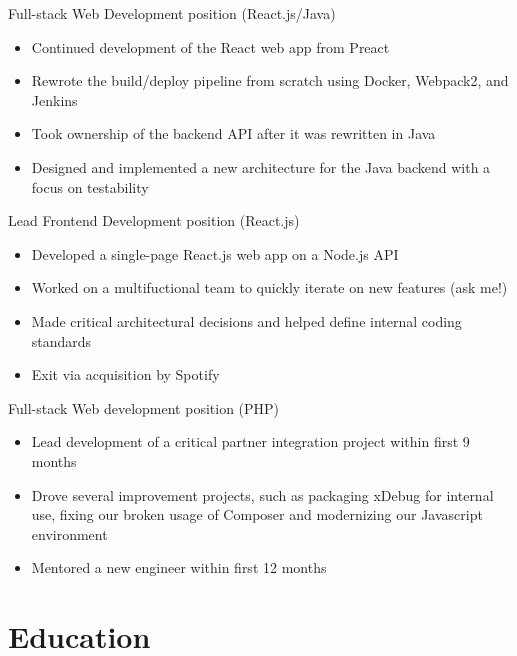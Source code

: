 	{Full-stack Web Development position (React.js/Java)}{
	\begin{itemize}
	\item Continued development of the React web app from Preact
	\item Rewrote the build/deploy pipeline from scratch using Docker, Webpack2, and Jenkins
	\item Took ownership of the backend API after it was rewritten in Java
	\item Designed and implemented a new architecture for the Java backend with a focus on testability
	\end{itemize}
}
	{Lead Frontend Development position (React.js)}{
	\begin{itemize}
	\item Developed a single-page React.js web app on a Node.js API
	\item Worked on a multifuctional team to quickly iterate on new features (ask me!)
	\item Made critical architectural decisions and helped define internal coding standards
	\item Exit via acquisition by Spotify
	\end{itemize}
}
	{Full-stack Web development position (PHP)}{
	\begin{itemize}
	\item Lead development of a critical partner integration project within first 9 months
	\item Drove several improvement projects, such as packaging xDebug for internal use, fixing our broken usage of Composer and modernizing our Javascript environment
	\item Mentored a new engineer within first 12 months
	\end{itemize}
}

\section{Education}

